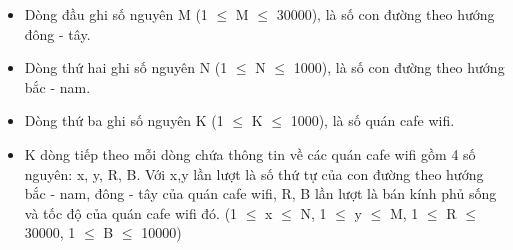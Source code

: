 \begin{itemize}
	\item Dòng đầu ghi số nguyên M (1 $\le$ M $\le$ 30000), là số con đường theo hướng đông - tây.
	\item Dòng thứ hai ghi số nguyên N (1 $\le$ N $\le$ 1000), là số con đường theo hướng bắc - nam.
	\item Dòng thứ ba ghi số nguyên K (1 $\le$ K $\le$ 1000), là số quán cafe wifi.
	\item K dòng tiếp theo mỗi dòng chứa thông tin về các quán cafe wifi gồm 4 số nguyên: x, y, R, B. Với x,y lần lượt là số thứ tự của con đường theo hướng bắc - nam, đông - tây của quán cafe wifi, R, B lần lượt là bán kính phủ sống và tốc độ của quán cafe wifi đó. (1 $\le$ x $\le$ N, 1 $\le$ y $\le$ M, 1 $\le$ R $\le$ 30000, 1 $\le$ B $\le$ 10000)
\end{itemize}